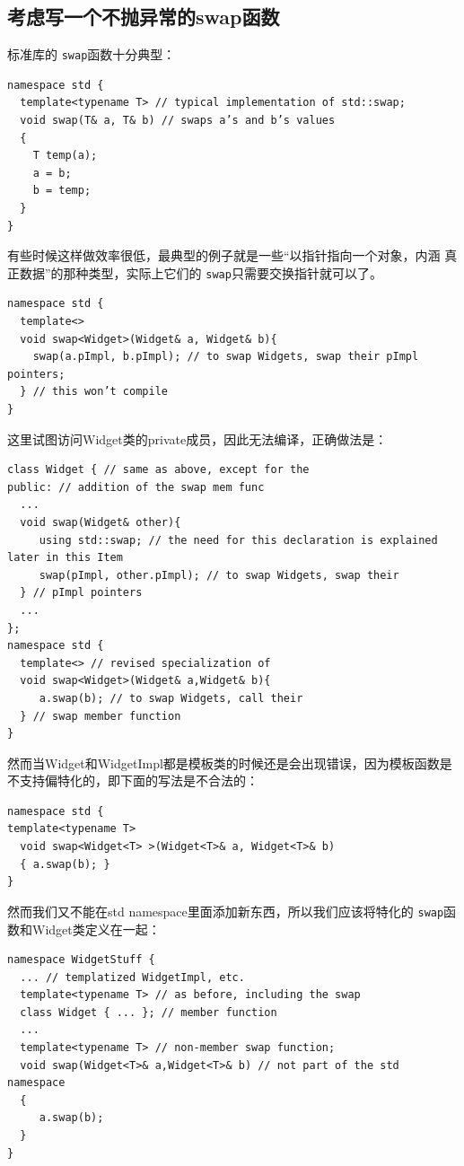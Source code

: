 \documentclass[a4paper,twoside]{article}
\theoremstyle{definition}
\theoremstyle{remark}
\numberwithin{equation}{section}
\let\OldTexttt\texttt
\renewcommand{\texttt}[1]{{\color{blue} \OldTexttt{#1}}}
\begin{document}
\subsection{考虑写一个不抛异常的swap函数}
\label{sec:Item-25}

标准库的\texttt{swap}函数十分典型：
\begin{verbatim}
namespace std {
  template<typename T> // typical implementation of std::swap;
  void swap(T& a, T& b) // swaps a’s and b’s values
  {
    T temp(a);
    a = b;
    b = temp;
  }
}
\end{verbatim}

有些时候这样做效率很低，最典型的例子就是一些“以指针指向一个对象，内涵
真正数据”的那种类型，实际上它们的\texttt{swap}只需要交换指针就可以了。

\begin{verbatim}
namespace std {
  template<> 
  void swap<Widget>(Widget& a, Widget& b){
    swap(a.pImpl, b.pImpl); // to swap Widgets, swap their pImpl pointers;
  } // this won’t compile
}
\end{verbatim}
这里试图访问Widget类的private成员，因此无法编译，正确做法是：
\begin{verbatim}
class Widget { // same as above, except for the
public: // addition of the swap mem func
  ...
  void swap(Widget& other){
     using std::swap; // the need for this declaration is explained later in this Item
     swap(pImpl, other.pImpl); // to swap Widgets, swap their
  } // pImpl pointers
  ...
};
namespace std {
  template<> // revised specialization of
  void swap<Widget>(Widget& a,Widget& b){
     a.swap(b); // to swap Widgets, call their
  } // swap member function
}
\end{verbatim}

然而当Widget和WidgetImpl都是模板类的时候还是会出现错误，因为模板函数是
不支持偏特化的，即下面的写法是不合法的：
\begin{verbatim}
namespace std {
template<typename T>
  void swap<Widget<T> >(Widget<T>& a, Widget<T>& b)
  { a.swap(b); }
}
\end{verbatim}
然而我们又不能在std namespace里面添加新东西，所以我们应该将特化的
\texttt{swap}函数和Widget类定义在一起：
\begin{verbatim}
namespace WidgetStuff {
  ... // templatized WidgetImpl, etc.
  template<typename T> // as before, including the swap
  class Widget { ... }; // member function
  ...
  template<typename T> // non-member swap function;
  void swap(Widget<T>& a,Widget<T>& b) // not part of the std namespace
  {
     a.swap(b);
  }
}
\end{verbatim}
\end{document}
